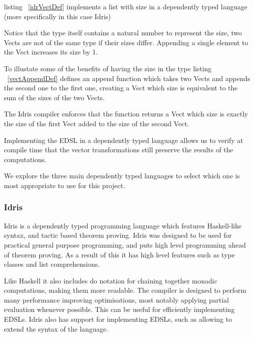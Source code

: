 listing ~\ref{idrVectDef} implements a list with size in a dependently typed language (more specifically in this case Idris) 


Notice that the type itself contains a natural number to represent the size, 
two Vects are not of the same type if their sizes differ. Appending a single element to the Vect increases
its size by 1.

To illustate some of the benefits of having the size in the type listing ~\ref{vectAppendDef} defines an append function 
which takes two Vects and appends the second one to the first one, 
creating a Vect which size is equivalent to the sum of the sizes of the two Vects.


The Idris compiler enforces that the function returns a Vect which size is exactly the size of the first Vect 
added to the size of the second Vect.

Implementing the EDSL in a dependently typed language allows us to verify at compile time that the vector
transformations still preserve the results of the computations.

We explore the three main dependently typed languages to select which one is most appropriate to
use for this project.

\subsubsection{Idris}

Idris\cite{idris} is a dependently typed programming language which features Haskell-like syntax, and tactic
based theorem proving. Idris was designed to be used for practical general purpose programming, and puts high level
programming ahead of theorem proving. As a result of this it has high level features such as type classes and list 
comprehensions. 

Like Haskell it also includes do notation for chaining together monadic computations, making them more readable. 
The compiler is designed to perform many performance improving
optimisations, most notably applying partial evaluation whenever possible. This can be useful for efficiently implementing
EDSLs\cite{edslidris}. Idris also has support for implementing EDSLs\cite{edslidris2}, such as allowing to extend the syntax of the language.   

